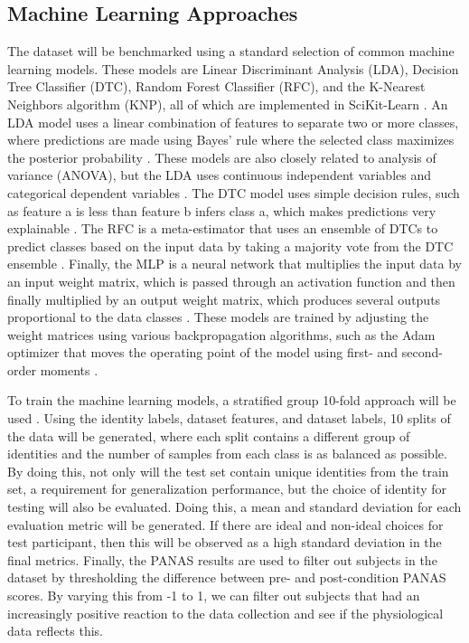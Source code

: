 \documentclass[12pt]{iopart}
\begin{document}
\subsection*{Machine Learning Approaches}

The dataset will be benchmarked using a standard selection of common machine learning models.  These models are Linear Discriminant Analysis (LDA), Decision Tree Classifier (DTC), Random Forest Classifier (RFC), and the K-Nearest Neighbors algorithm (KNP), all of which are implemented in SciKit-Learn \cite{pedregosa2011scikit}.  An LDA model uses a linear combination of features to separate two or more classes, where predictions are made using Bayes’ rule where the selected class maximizes the posterior probability \cite{hastie2009elements}.  These models are also closely related to analysis of variance (ANOVA), but the LDA uses continuous independent variables and categorical dependent variables \cite{wetcher2011analyzing}.  The DTC model uses simple decision rules, such as feature a is less than feature b infers class a, which makes predictions very explainable \cite{breiman1984nonlinear}.  The RFC is a meta-estimator that uses an ensemble of DTCs to predict classes based on the input data by taking a majority vote from the DTC ensemble \cite{breiman1999random}.  Finally, the MLP is a neural network that multiplies the input data by an input weight matrix, which is passed through an activation function and then finally multiplied by an output weight matrix, which produces several outputs proportional to the data classes \cite{hinton1990connectionist}.  These models are trained by adjusting the weight matrices using various backpropagation algorithms, such as the Adam optimizer that moves the operating point of the model using first- and second-order moments \cite{kingma2014adam}.

To train the machine learning models, a stratified group 10-fold approach will be used \cite{pedregosa2011scikit}.  Using the identity labels, dataset features, and dataset labels, 10 splits of the data will be generated, where each split contains a different group of identities and the number of samples from each class is as balanced as possible.  By doing this, not only will the test set contain unique identities from the train set, a requirement for generalization performance, but the choice of identity for testing will also be evaluated.  Doing this, a mean and standard deviation for each evaluation metric will be generated.  If there are ideal and non-ideal choices for test participant, then this will be observed as a high standard deviation in the final metrics.  Finally, the PANAS results are used to filter out subjects in the dataset by thresholding the difference between pre- and post-condition PANAS scores.  By varying this from -1 to 1, we can filter out subjects that had an increasingly positive reaction to the data collection and see if the physiological data reflects this.
\end{document}

